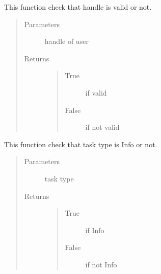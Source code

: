 \documentclass[letterpaper,10pt,english]{sphinxmanual}
\begin{document}

\begin{fulllineitems}
\label{\detokenize{janta:janta.viewhelper.is_handle}}
This function check that handle is valid or not.
\begin{quote}\begin{description}
\item[{Parameters}] \leavevmode
{} \textendash{} handle of user

\item[{Returns}] \leavevmode
\begin{quote}\begin{description}
\item[{True}] \leavevmode
if valid

\item[{False}] \leavevmode
if not valid

\end{description}\end{quote}


\end{description}\end{quote}

\end{fulllineitems}


\begin{fulllineitems}
\label{\detokenize{janta:janta.viewhelper.is_info}}
This function check that task type is Info or not.
\begin{quote}\begin{description}
\item[{Parameters}] \leavevmode
{} \textendash{} task type

\item[{Returns}] \leavevmode
\begin{quote}\begin{description}
\item[{True}] \leavevmode
if Info

\item[{False}] \leavevmode
if not Info

\end{description}\end{quote}


\end{description}\end{quote}

\end{fulllineitems}
\end{document}
